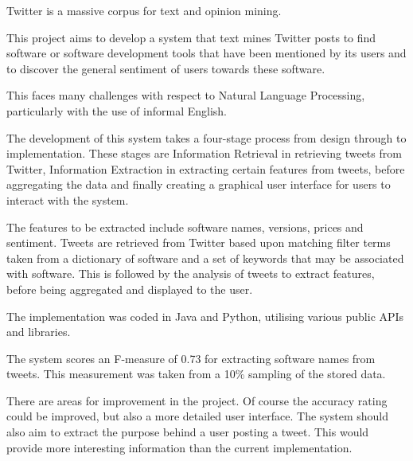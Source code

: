 Twitter is a massive corpus for text and opinion mining.

This project aims to develop a system that text mines Twitter posts to find software or software development tools that have been mentioned by its users and to discover the general sentiment of users towards these software.

This faces many challenges with respect to Natural Language Processing, particularly with the use of informal English.

The development of this system takes a four-stage process from design through to implementation. These stages are Information Retrieval in retrieving tweets from Twitter, Information Extraction in extracting certain features from tweets, before aggregating the data and finally creating a graphical user interface for users to interact with the system.

The features to be extracted include software names, versions, prices and sentiment. Tweets are retrieved from Twitter based upon matching filter terms taken from a dictionary of software and a set of keywords that may be associated with software. This is followed by the analysis of tweets to extract features, before being aggregated and displayed to the user.

The implementation was coded in Java and Python, utilising various public APIs and libraries.

The system scores an F-measure of 0.73 for extracting software names from tweets. This measurement was taken from a 10\% sampling of the stored data. 

There are areas for improvement in the project. Of course the accuracy rating could be improved, but also a more detailed user interface. The system should also aim to extract the purpose behind a user posting a tweet. This would provide more interesting information than the current implementation.

